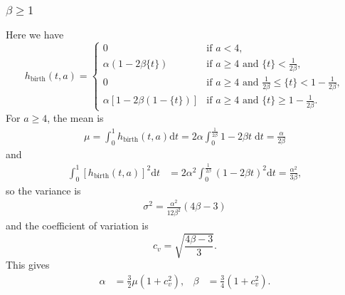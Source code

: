 \documentclass{article}
\newcommand{\md}{\mathrm{d}}
\begin{document}
\subsubsection{$\beta \geq 1$}

Here we have
\begin{equation}
  h_{\text{birth}}(t, a) =
  \begin{cases}
    0 & \text{if $a < 4$},
    \\
    \alpha \left(1 - 2 \beta \{t\}\right)
    & \text{if $a \geq 4$ and $\{t\} < \frac{1}{2 \beta}$},
    \\
    0 & \text{if $a \geq 4$ and $\frac{1}{2 \beta} \leq \{t\} < 1 -
      \frac{1}{2 \beta}$},
    \\
    \alpha \left[1 - 2 \beta (1 - \{t\})\right]
    & \text{if $a \geq 4$ and $\{t\} \geq 1 - \frac{1}{2 \beta}$}.
  \end{cases}
\end{equation}
For $a \geq 4$, the mean is
\begin{align}
  \mu = \int_0^1 h_{\text{birth}}(t, a) \md t
  = 2 \alpha \int_0^{\frac{1}{2 \beta}} 1 - 2 \beta t \; \md t
  = \frac{\alpha}{2 \beta}
\end{align}
and
\begin{align}
  \int_0^1 \left[h_{\text{birth}}(t, a)\right]^2 \md t
  & = 2 \alpha^2 \int_0^{\frac{1}{2 \beta}} \left(1 - 2 \beta t\right)^2 \md t
  = \frac{\alpha^2}{3 \beta},
\end{align}
so the variance is
\begin{align}
  \sigma^2 = \frac{\alpha^2}{12 \beta^2} (4 \beta - 3)
\end{align}
and the coefficient of variation is
\begin{equation}
  c_v = \sqrt{\frac{4 \beta - 3}{3}}.
\end{equation}
This gives
\begin{align}
  \alpha &= \frac{3}{2} \mu \left(1 + c_v^2\right),
  &
  \beta &= \frac{3}{4} \left(1 + c_v^2\right).
\end{align}
\end{document}
